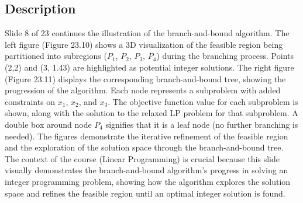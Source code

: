 \documentclass{article}%
\begin{document}
\subsection{Description}%
Slide 8 of 23 continues the illustration of the branch-and-bound algorithm. The left figure (Figure 23.10) shows a 3D visualization of the feasible region being partitioned into subregions ($P_1$, $P_2$, $P_3$, $P_4$) during the branching process.  Points (2,2) and (3, 1.43) are highlighted as potential integer solutions. The right figure (Figure 23.11) displays the corresponding branch-and-bound tree, showing the progression of the algorithm. Each node represents a subproblem with added constraints on $x_1$, $x_2$, and $x_3$.  The objective function value for each subproblem is shown, along with the solution to the relaxed LP problem for that subproblem.  A double box around node $P_4$ signifies that it is a leaf node (no further branching is needed). The figures demonstrate the iterative refinement of the feasible region and the exploration of the solution space through the branch-and-bound tree. The context of the course (Linear Programming) is crucial because this slide visually demonstrates the branch-and-bound algorithm's progress in solving an integer programming problem, showing how the algorithm explores the solution space and refines the feasible region until an optimal integer solution is found.%
\end{document}
